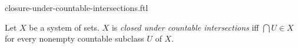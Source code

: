\documentclass{naproche-library}
\begin{document}
\begin{smodule}[title=Closure Under Countable Intersections]{closure-under-countable-intersections.ftl}

\begin{definition}[forthel,id=FOUNDATIONS_14_451771879129088]
  Let $X$ be a system of sets.
  $X$ is \emph{closed under countable intersections} iff $\bigcap U \in X$ for every nonempty countable subclass $U$ of $X$.
\end{definition}
\end{smodule}
\end{document}
